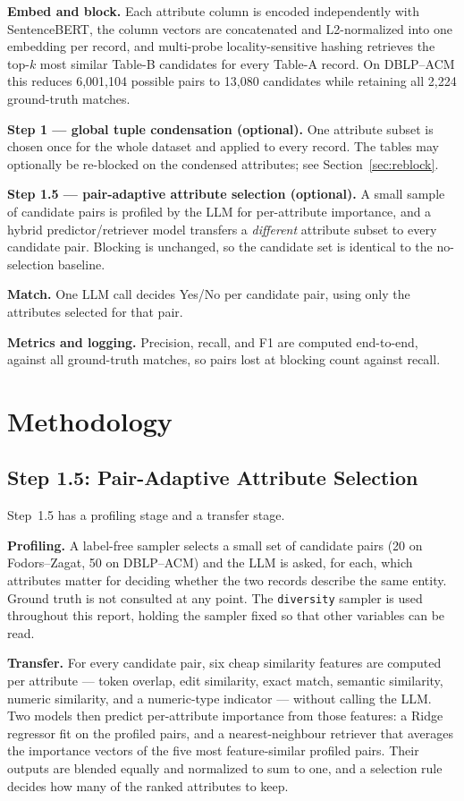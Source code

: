 \documentclass[11pt]{article}
\begin{document}
\textbf{Embed and block.} Each attribute column is encoded independently with SentenceBERT,
the column vectors are concatenated and L2-normalized into one embedding per record, and
multi-probe locality-sensitive hashing retrieves the top-$k$ most similar Table-B candidates
for every Table-A record. On DBLP--ACM this reduces 6{,}001{,}104 possible pairs to 13{,}080
candidates while retaining all 2{,}224 ground-truth matches.

\textbf{Step 1 --- global tuple condensation (optional).} One attribute subset is chosen
once for the whole dataset and applied to every record. The tables may optionally be
re-blocked on the condensed attributes; see Section~\ref{sec:reblock}.

\textbf{Step 1.5 --- pair-adaptive attribute selection (optional).} A small sample of
candidate pairs is profiled by the LLM for per-attribute importance, and a hybrid
predictor/retriever model transfers a \emph{different} attribute subset to every candidate
pair. Blocking is unchanged, so the candidate set is identical to the no-selection baseline.

\textbf{Match.} One LLM call decides Yes/No per candidate pair, using only the attributes
selected for that pair.

\textbf{Metrics and logging.} Precision, recall, and F1 are computed end-to-end, against all
ground-truth matches, so pairs lost at blocking count against recall.

\section{Methodology}
\label{sec:methodology}

\subsection{Step 1.5: Pair-Adaptive Attribute Selection}

Step~1.5 has a profiling stage and a transfer stage.

\textbf{Profiling.} A label-free sampler selects a small set of candidate pairs (20 on
Fodors--Zagat, 50 on DBLP--ACM) and the LLM is asked, for each, which attributes matter for
deciding whether the two records describe the same entity. Ground truth is not consulted at
any point. The \texttt{diversity} sampler is used throughout this report, holding the
sampler fixed so that other variables can be read.

\textbf{Transfer.} For every candidate pair, six cheap similarity features are computed per
attribute --- token overlap, edit similarity, exact match, semantic similarity, numeric
similarity, and a numeric-type indicator --- without calling the LLM. Two models then
predict per-attribute importance from those features: a Ridge regressor fit on the profiled
pairs, and a nearest-neighbour retriever that averages the importance vectors of the five
most feature-similar profiled pairs. Their outputs are blended equally and normalized to sum
to one, and a selection rule decides how many of the ranked attributes to keep.
\end{document}
